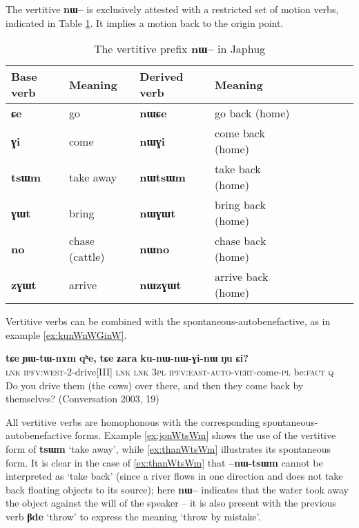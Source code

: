 \documentclass[oldfontcommands,oneside,a4paper,11pt]{article}
\newcommand{\ipa}[1]{\textbf{{\phon\mbox{#1}}}} %
\begin{document}
The vertitive \ipa{nɯ--}  is exclusively attested with a restricted set of motion verbs, indicated in Table \ref{tab:vertitive}. It implies a motion back to the origin point.
 
\begin{table}[h]
\caption{The vertitive prefix \ipa{nɯ--} in Japhug} \centering \label{tab:vertitive}
\begin{tabular}{lllllllll}
\toprule
Base verb & Meaning & Derived verb & Meaning& \\
\midrule
\ipa{ɕe} & go & \ipa{nɯɕe} & go back (home) & \\
\ipa{ɣi} & come & \ipa{nɯɣi} & come back (home)& \\
\ipa{tsɯm} & take away & \ipa{nɯtsɯm} & take back  (home)& \\
\ipa{ɣɯt} & bring & \ipa{nɯɣɯt} & bring back  (home)& \\
\ipa{no} & chase (cattle) & \ipa{nɯno} & chase back  (home)& \\
\ipa{zɣɯt} & arrive & \ipa{nɯzɣɯt} & arrive back (home)& \\
\bottomrule
\end{tabular}
\end{table}
Vertitive verbs can be combined with the spontaneous-autobenefactive, as in example \ref{ex:kunWnWGinW}. 


\begin{exe}
\ex \label{ex:kunWnWGinW}
\gll 
\ipa{tɕe}  	\ipa{ɲɯ-tɯ-nɤm}  	\ipa{qʰe,}  	\ipa{tɕe}  	\ipa{ʑara}  	\ipa{ku-nɯ-nɯ-ɣi-nɯ}  	\ipa{ŋu}  	\ipa{ɕi?}  \\
\textsc{lnk} \textsc{ipfv:west}-2-drive[III] \textsc{lnk} \textsc{lnk} \textsc{3pl} \textsc{ipfv:east}-\textsc{auto-vert}-come-\textsc{pl} be:\textsc{fact} \textsc{q} \\
\glt Do you drive them (the cows) over there, and then they come back by themselves? (Conversation 2003, 19)
\end{exe}

All vertitive verbs are homophonous with the corresponding spontaneous-autobenefactive forms. Example \ref{ex:jonWtsWm} shows the use of the vertitive form of \ipa{tsɯm} `take away', while \ref{ex:thanWtsWm} illustrates its spontaneous form. It is clear in the case of \ref{ex:thanWtsWm} that \ipa{--nɯ-tsɯm} cannot be interpreted as `take back' (since a river flows in one direction and does not take back floating objects to its source); here \ipa{nɯ--} indicates that the water took away the object against the will of the speaker -- it is also present with the previous verb \ipa{βde} `throw' to express the meaning `throw by mistake'.
\end{document}
